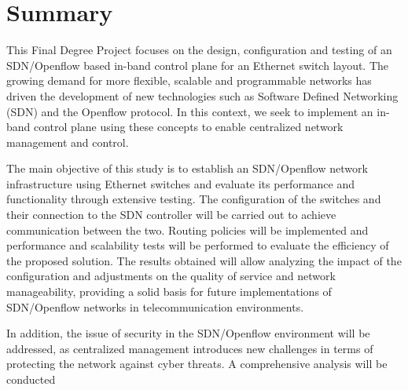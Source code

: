\documentclass[a4paper, 12pt]{book}
\begin{document}
	\chapter*{Summary}
	
	This Final Degree Project focuses on the design, configuration and testing of an SDN/Openflow based in-band control plane for an Ethernet switch layout. The growing demand for more flexible, scalable and programmable networks has driven the development of new technologies such as Software Defined Networking (SDN) and the Openflow protocol. In this context, we seek to implement an in-band control plane using these concepts to enable centralized network management and control.
	
	The main objective of this study is to establish an SDN/Openflow network infrastructure using Ethernet switches and evaluate its performance and functionality through extensive testing. The configuration of the switches and their connection to the SDN controller will be carried out to achieve communication between the two. Routing policies will be implemented and performance and scalability tests will be performed to evaluate the efficiency of the proposed solution. The results obtained will allow analyzing the impact of the configuration and adjustments on the quality of service and network manageability, providing a solid basis for future implementations of SDN/Openflow networks in telecommunication environments.
	
	In addition, the issue of security in the SDN/Openflow environment will be addressed, as centralized management introduces new challenges in terms of protecting the network against cyber threats. A comprehensive analysis will be conducted
	
	
	
	
	\tableofcontents 
	\cleardoublepage
	\listoffigures %
	
\end{document}
